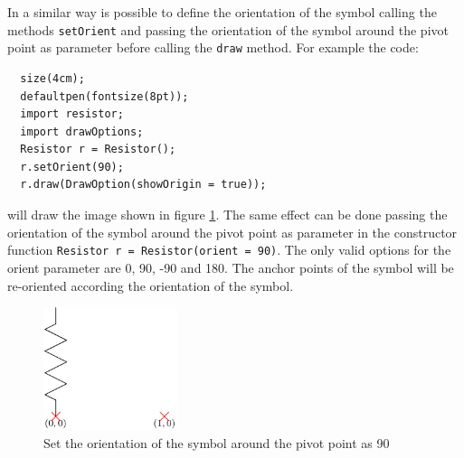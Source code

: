 \documentclass[a4paper,12pt]{report}
\begin{document}
In a similar way is possible to define the orientation of the symbol calling the methods \texttt{setOrient} and passing the orientation of the symbol around the pivot point as parameter before calling the \texttt{draw} method. For example the code:
\begin{lstlisting}
  size(4cm);
  defaultpen(fontsize(8pt));
  import resistor;
  import drawOptions;
  Resistor r = Resistor();
  r.setOrient(90);
  r.draw(DrawOption(showOrigin = true));
\end{lstlisting}
will draw the image shown in figure \ref{fig:placingExample2}. The same effect can be done passing the orientation of the symbol around the pivot point as parameter in the constructor function \texttt{Resistor r = Resistor(orient = 90)}. The only valid options for the orient parameter are 0, 90, -90  and 180. The anchor points of the symbol will be re-oriented according the orientation of the symbol.
\begin{figure}[ht]
  \centering
  \includegraphics[width=0.35\textwidth]{placingExample2.pdf}
  \caption{Set the orientation of the symbol around the pivot point as 90}
  \label{fig:placingExample2}
\end{figure}
\end{document}

